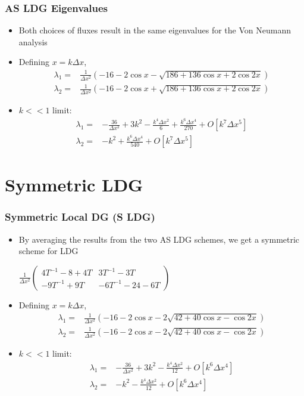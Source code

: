 \documentclass[serif,12pt]{beamer}
\begin{document}
\begin{frame}
  \frametitle{AS LDG Eigenvalues}
  \begin{itemize}
  \item Both choices of fluxes result in the same eigenvalues for the Von Neumann analysis
  \item Defining $x = k\Delta x$,
    \begin{align*}
      \lambda_1 = & \frac{1}{\Delta x^2}\left(-16 - 2 \cos x - \sqrt{186 + 136 \cos x + 2 \cos 2x}\right)\\
      \lambda_2 = & \frac{1}{\Delta x^2}\left(-16 - 2 \cos x + \sqrt{186 + 136 \cos x + 2 \cos 2x}\right)
    \end{align*}
  \item $k << 1$ limit:
    \begin{align*}
      \lambda_1 = & -\frac{36}{\Delta x^2} + 3 k^2 - \frac{k^4\Delta x^2}{6} + \frac{k^6\Delta x^4}{270} + O[k^7\Delta x^5]\\
      \lambda_2 = & -k^2 + \frac{k^6\Delta x^4}{540} + O[k^7\Delta x^5]
    \end{align*}
  \end{itemize}
\end{frame}

\section{Symmetric LDG}
\begin{frame}
  \frametitle{Symmetric Local DG (S LDG)}
  \begin{itemize}
  \item By averaging the results from the two AS LDG schemes, we get a symmetric scheme for LDG\\
    \begin{center}
      $\frac{1}{\Delta x^2}\left(
        \begin{array}{cc}
          4T^{-1} -8+4 T & 3T^{-1}-3 T \\
          -9 T^{-1} +9 T & -6 T^{-1} -24-6 T
        \end{array}
      \right)$
    \end{center}
  \item Defining $x = k\Delta x$,
    \begin{align*}
      \lambda_1 = & \frac{1}{\Delta x^2}\left(-16 - 2 \cos x - 2 \sqrt{42 + 40 \cos x - \cos 2x}\right)\\
      \lambda_2 = & \frac{1}{\Delta x^2}\left(-16 - 2 \cos x - 2 \sqrt{42 + 40 \cos x - \cos 2x}\right)
    \end{align*}
  \item $k << 1$ limit:
    \begin{align*}
      \lambda_1 = & -\frac{36}{\Delta x^2} + 3 k^2 - \frac{k^4\Delta x^2}{12} + O[k^6\Delta x^4]\\
      \lambda_2 = & -k^2 - \frac{k^4\Delta x^2}{12} +  O[k^6\Delta x^4]
    \end{align*}
  \end{itemize}
\end{frame}
\end{document}
